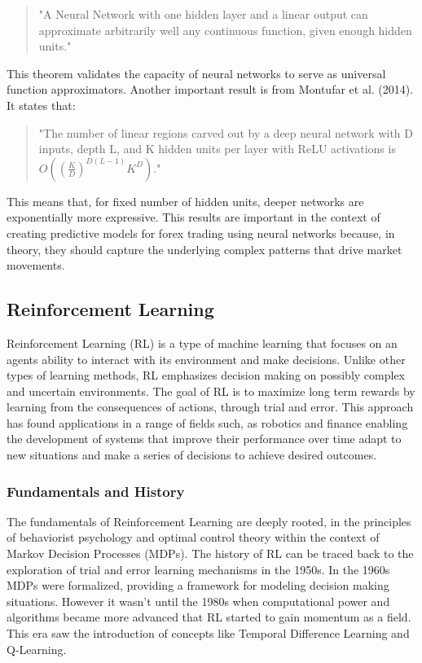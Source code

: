 \begin{quote}
"A Neural Network with one hidden layer and a linear output can approximate arbitrarily well any continuous function, given enough hidden units."
\end{quote}

This theorem validates the capacity of neural networks to serve as universal function approximators. Another important result is from Montufar et al. (2014). It states that:
\begin{quote}
"The number of linear regions carved out by a deep neural network with D inputs, depth L, and K hidden units per layer with ReLU activations is \(O\left(\left(\frac{K}{D}\right)^{D(L-1)}K^D\right)\)."
\end{quote}

This means that, for fixed number of hidden units, deeper networks are exponentially more expressive. This results are important in the context of creating predictive models for forex trading using neural networks because, in theory, they should capture the underlying complex patterns that drive market movements.

\subsection{Reinforcement Learning}
Reinforcement Learning (RL) is a type of machine learning that focuses on an agents ability to interact with its environment and make decisions. Unlike other types of learning methods, RL emphasizes decision making on possibly complex and uncertain environments. The goal of RL is to maximize long term rewards by learning from the consequences of actions, through trial and error. This approach has found applications in a range of fields such, as robotics and finance enabling the development of systems that improve their performance over time adapt to new situations and make a series of decisions to achieve desired outcomes.

\subsubsection{Fundamentals and History}
The fundamentals of Reinforcement Learning are deeply rooted, in the principles of behaviorist psychology and optimal control theory within the context of Markov Decision Processes (MDPs). The history of RL can be traced back to the exploration of trial and error learning mechanisms in the 1950s. In the 1960s MDPs were formalized, providing a framework for modeling decision making situations. However it wasn't until the 1980s when computational power and algorithms became more advanced that RL started to gain momentum as a field. This era saw the introduction of concepts like Temporal Difference Learning and Q-Learning.

